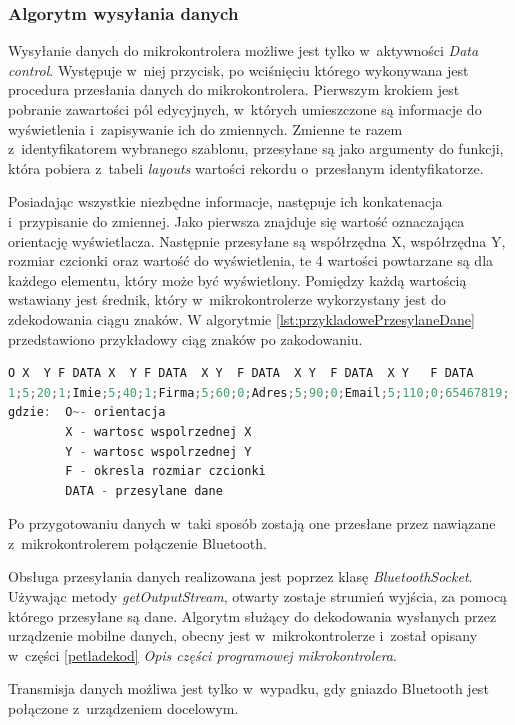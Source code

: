 \documentclass[a4paper,12pt, twoside]{article}
\begin{document}
    	\subsubsection{Algorytm wysyłania danych}
    	Wysyłanie danych do mikrokontrolera możliwe jest tylko w~aktywności \textit{Data control}. Występuje w~niej przycisk, po wciśnięciu którego wykonywana jest procedura przesłania danych do mikrokontrolera. Pierwszym krokiem jest pobranie zawartości pól edycyjnych, w~których umieszczone są informacje do wyświetlenia i~zapisywanie ich do zmiennych. Zmienne te razem z~identyfikatorem wybranego szablonu, przesyłane są jako argumenty do funkcji, która pobiera z~tabeli \textit{layouts} wartości rekordu o~przesłanym identyfikatorze.
    	
    	Posiadając wszystkie niezbędne informacje, następuje ich konkatenacja i~przypisanie do zmiennej. Jako pierwsza znajduje się wartość oznaczająca orientację wyświetlacza. Następnie przesyłane są współrzędna X, współrzędna Y, rozmiar czcionki oraz wartość do wyświetlenia, te 4 wartości powtarzane są dla każdego elementu, który może być wyświetlony. Pomiędzy każdą wartością wstawiany jest średnik, który w~mikrokontrolerze wykorzystany jest do zdekodowania ciągu znaków. W algorytmie \ref{lst:przykladowePrzesylaneDane} przedstawiono przykładowy ciąg znaków po zakodowaniu.
    	\begin{lstlisting}[language=C++, label={lst:przykladowePrzesylaneDane}, caption=Przykładowy ciąg przesyłanych danych]
O X  Y F DATA X  Y F DATA  X Y  F DATA  X Y  F DATA  X Y   F DATA	
1;5;20;1;Imie;5;40;1;Firma;5;60;0;Adres;5;90;0;Email;5;110;0;65467819;
gdzie:  O~- orientacja
        X - wartosc wspolrzednej X
        Y - wartosc wspolrzednej Y
        F - okresla rozmiar czcionki
        DATA - przesylane dane\end{lstlisting}
    
    	Po przygotowaniu danych w~taki sposób zostają one przesłane przez nawiązane z~mikrokontrolerem połączenie Bluetooth.

    	Obsługa przesyłania danych realizowana jest poprzez klasę \textit{BluetoothSocket}. Używając metody \textit{getOutputStream}\cite{outputstream}, otwarty zostaje strumień wyjścia, za pomocą którego przesyłane są dane. Algorytm służący do dekodowania wysłanych przez urządzenie mobilne danych, obecny jest w~mikrokontrolerze i~został opisany w~części \ref{petladekod} \textit{Opis części programowej mikrokontrolera}.
    	
    	Transmisja danych możliwa jest tylko w~wypadku, gdy gniazdo Bluetooth jest połączone z~urządzeniem docelowym.
	
\end{document}
